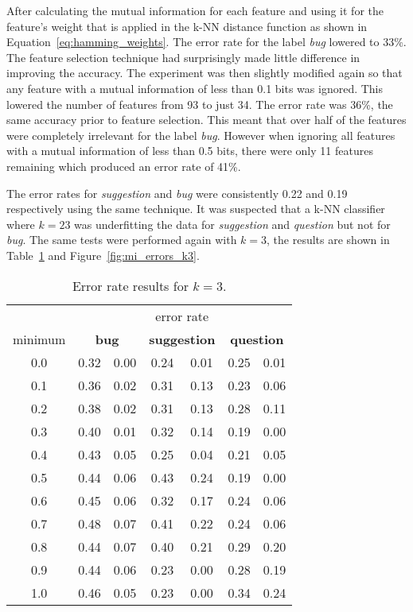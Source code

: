 After calculating the mutual information for each feature and using it for the feature's weight that is applied in the k-NN
distance function as shown in Equation~\ref{eq:hamming_weights}. The error rate for the label \textit{bug} lowered to 33\%. The
feature selection technique had surprisingly made little difference in improving the accuracy. The experiment was then slightly
modified again so that any feature with a mutual information of less than 0.1 bits was ignored. This lowered the number of
features from 93 to just 34. The error rate was 36\%, the same accuracy prior to feature selection. This meant that over half of
the features were completely irrelevant for the label \textit{bug}. However when ignoring all features with a mutual information
of less than 0.5 bits, there were only 11 features remaining which produced an error rate of 41\%.

The error rates for \textit{suggestion} and \textit{bug} were consistently 0.22 and 0.19 respectively using the same technique.
It was suspected that a k-NN classifier where $k = 23$ was underfitting the data for \textit{suggestion} and \textit{question}
but not for \textit{bug}. The same tests were performed again with $k = 3$, the results are shown in
Table~\ref{tbl:mi_errors_k3} and Figure~\ref{fig:mi_errors_k3}.

\begin{table}[h]
	\centering
	\begin{tabular}{|c||cc|cc|cc|}
	\hline

	& \multicolumn{6}{c|}{error rate} \\

	minimum &
	\multicolumn{2}{c|}{\textbf{bug}} &
	\multicolumn{2}{c|}{\textbf{suggestion}} &
	\multicolumn{2}{c|}{\textbf{question}}
	
	\\
	\hline

	0.0 & 0.32 & 0.00 & 0.24 & 0.01 & 0.25 & 0.01 \\
	0.1 & 0.36 & 0.02 & 0.31 & 0.13 & 0.23 & 0.06 \\
	0.2 & 0.38 & 0.02 & 0.31 & 0.13 & 0.28 & 0.11 \\
	0.3 & 0.40 & 0.01 & 0.32 & 0.14 & 0.19 & 0.00 \\
	0.4 & 0.43 & 0.05 & 0.25 & 0.04 & 0.21 & 0.05 \\
	0.5 & 0.44 & 0.06 & 0.43 & 0.24 & 0.19 & 0.00 \\
	0.6 & 0.45 & 0.06 & 0.32 & 0.17 & 0.24 & 0.06 \\
	0.7 & 0.48 & 0.07 & 0.41 & 0.22 & 0.24 & 0.06 \\
	0.8 & 0.44 & 0.07 & 0.40 & 0.21 & 0.29 & 0.20 \\
	0.9 & 0.44 & 0.06 & 0.23 & 0.00 & 0.28 & 0.19 \\
	1.0 & 0.46 & 0.05 & 0.23 & 0.00 & 0.34 & 0.24 \\

	\hline
	\end{tabular}
	\label{tbl:mi_errors_k3}
	\caption{Error rate results for $k = 3$.}
\end{table}

